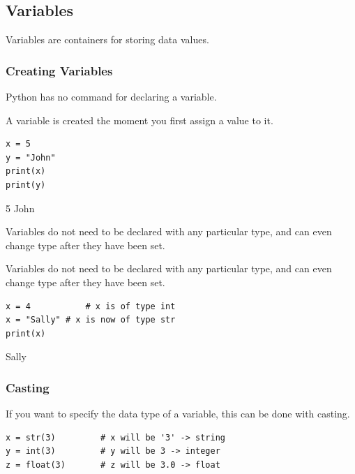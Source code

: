 \documentclass[12pt,a4paper]{article}
\begin{document}
\subsection{Variables}

Variables are containers for storing data values.

\subsubsection{Creating Variables}

Python has no command for declaring a variable.

A variable is created the moment you first assign a value to it.

\begin{ebox}
	\begin{lstlisting}
x = 5
y = "John"
print(x)
print(y)
	\end{lstlisting}
\tcblower
	\begin{vercode}
5
John
	\end{vercode}
\end{ebox}

Variables do not need to be declared with any particular type, and can even
change type after they have been set.

Variables do not need to be declared with any particular type, and can even
change type after they have been set.

\begin{ebox}
	\begin{lstlisting}
x = 4			# x is of type int
x = "Sally"	# x is now of type str
print(x)
	\end{lstlisting}
\tcblower
	\begin{vercode}
Sally
	\end{vercode}
\end{ebox}
\subsubsection{Casting}

If you want to specify the data type of a variable, this can be done with casting.

\begin{ebox}
	\begin{lstlisting}
x = str(3)         # x will be '3' -> string
y = int(3)         # y will be 3 -> integer
z = float(3)       # z will be 3.0 -> float
	\end{lstlisting}
\end{ebox}
\end{document}
